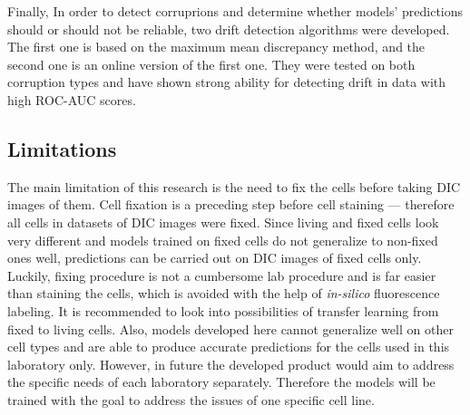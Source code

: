 Finally, In order to detect corruprions and determine whether models' predictions should or should not be reliable, two drift detection algorithms were developed. The first one is based on the maximum mean discrepancy method, and the second one is an online version of the first one. They were tested on both corruption types and have shown strong ability for detecting drift in data with high ROC-AUC scores.
  
\subsection{Limitations}
The main limitation of this research is the need to fix the cells before taking DIC images of them. Cell fixation is a preceding step before cell staining --- therefore all cells in datasets of DIC images were fixed. Since living and fixed cells look very different and models trained on fixed cells do not generalize to non-fixed ones well, predictions can be carried out on DIC images of fixed cells only. Luckily, fixing procedure is not a cumbersome lab procedure and is far easier than staining the cells, which is avoided with the help of \textit{in-silico} fluorescence labeling. It is recommended to look into possibilities of transfer learning from fixed to living cells. 
Also, models developed here cannot generalize well on other cell types and are able to produce accurate predictions for the cells used in this laboratory only. However, in future the developed product would aim to address the specific needs of each laboratory separately. Therefore the models will be trained with the goal to address the issues of one specific cell line. 


